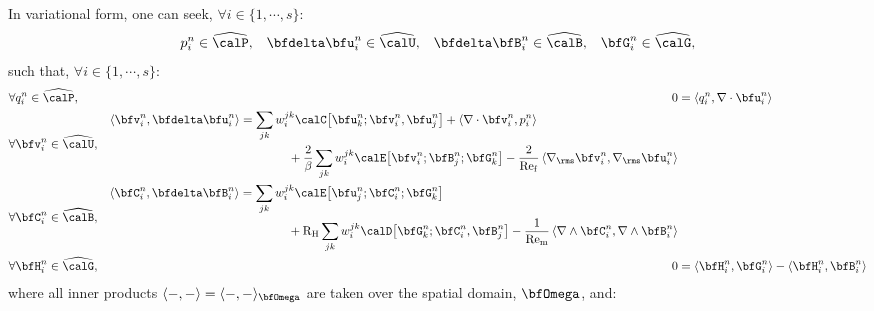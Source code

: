 \begin{example}
        In variational form, one can seek, $\forall i \in \{1, \cdots, s\}$:
        \begin{align}
                       p_{i}^{n}  \in  \widehat{\calP},  &&
            \bfdelta\bfu_{i}^{n}  \in  \widehat{\calU},  &&
            \bfdelta\bfB_{i}^{n}  \in  \widehat{\calB},  &&
                    \bfG_{i}^{n}  \in  \widehat{\calG},
        \end{align}
        such that, $\forall i \in \{1, \cdots, s\}$:
        \begin{align}
            &\forall     q_{i}^{n}  \in  \widehat{\calP},  &
                0
                &=
                \left\langle q_{i}^{n}, \nabla\cdot\bfu_{i}^{n}\right\rangle  \\
            &\forall  \bfv_{i}^{n}  \in  \widehat{\calU},  &
            \begin{split}
                \left\langle\bfv_{i}^{n}, \bfdelta\bfu_{i}^{n}\right\rangle
                &=
                \sum_{jk}w_{i}^{jk}\calC\!\left[\bfu_{k}^{n}; \bfv_{i}^{n}, \bfu_{j}^{n}\right]
                +  \left\langle\nabla\cdot\bfv_{i}^{n}, p_{i}^{n}\right\rangle  \\
                &\qquad\qquad+ \frac{2}{\beta}\sum_{jk}w_{i}^{jk}\calE\!\left[\bfv_{i}^{n}; \bfB_{j}^{n}; \bfG_{k}^{n}\right]
                - \frac{2}{\rmRef}\left\langle\nabla_{\rms}\bfv_{i}^{n}, \nabla_{\rms}\bfu_{i}^{n}\right\rangle
            \end{split}  \\
            &\forall  \bfC_{i}^{n}  \in  \widehat{\calB},  &
            \begin{split}
                \left\langle\bfC_{i}^{n}, \bfdelta\bfB_{i}^{n}\right\rangle
                &=
                \sum_{jk}w_{i}^{jk}\calE\!\left[\bfu_{j}^{n}; \bfC_{i}^{n}; \bfG_{k}^{n}\right]  \\
                &\qquad\qquad+ \rmRH\sum_{jk}w_{i}^{jk}\calD\!\left[\bfG_{k}^{n}; \bfC_{i}^{n}, \bfB_{j}^{n}\right]
                - \frac{1}{\rmRem}\left\langle\nabla\wedge\bfC_{i}^{n}, \nabla\wedge\bfB_{i}^{n}\right\rangle
            \end{split}  \\
            &\forall  \bfH_{i}^{n}  \in  \widehat{\calG},  &
                0
                &=
                \left\langle\bfH_{i}^{n}, \bfG_{i}^{n}\right\rangle
                - \left\langle\bfH_{i}^{n}, \bfB_{i}^{n}\right\rangle
        \end{align}
        where all inner products $\langle -, -\rangle  =  \langle -, -\rangle_{\bfOmega}$ are taken over the spatial domain, $\bfOmega$, and:

\end{example}
